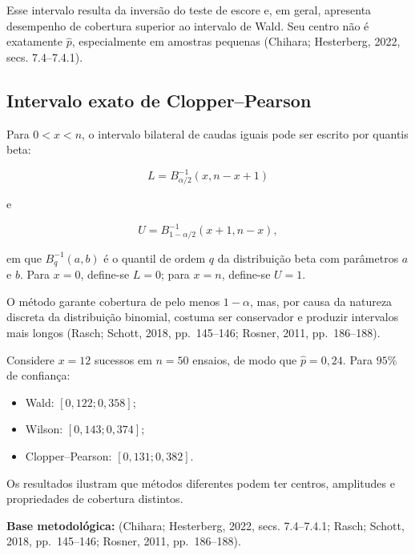 \documentclass[
  letterpaper,
  DIV=11,
  numbers=noendperiod]{scrreprt}
\providecommand{\tightlist}{%
  \setlength{\itemsep}{0pt}\setlength{\parskip}{0pt}}\usepackage{longtable,booktabs,array}
\begin{document}
Esse intervalo resulta da inversão do teste de escore e, em geral,
apresenta desempenho de cobertura superior ao intervalo de Wald. Seu
centro não é exatamente \(\widehat p\), especialmente em amostras
pequenas (Chihara; Hesterberg, 2022, secs. 7.4--7.4.1).

\subsection{Intervalo exato de
Clopper--Pearson}\label{intervalo-exato-de-clopperpearson}

Para \(0<x<n\), o intervalo bilateral de caudas iguais pode ser escrito
por quantis beta:

\[L=B^{-1}_{\alpha/2}(x,n-x+1)\]

e

\[U=B^{-1}_{1-\alpha/2}(x+1,n-x),\]

em que \(B^{-1}_q(a,b)\) é o quantil de ordem \(q\) da distribuição beta
com parâmetros \(a\) e \(b\). Para \(x=0\), define-se \(L=0\); para
\(x=n\), define-se \(U=1\).

O método garante cobertura de pelo menos \(1-\alpha\), mas, por causa da
natureza discreta da distribuição binomial, costuma ser conservador e
produzir intervalos mais longos (Rasch; Schott, 2018, pp.~145--146;
Rosner, 2011, pp.~186--188).

\begin{tcolorbox}[enhanced jigsaw, colback=white, leftrule=.75mm, colbacktitle=quarto-callout-note-color!10!white, breakable, titlerule=0mm, bottomtitle=1mm, title=\textcolor{quarto-callout-note-color}{\faInfo}\hspace{0.5em}{Exemplo --- comparação de intervalos para uma proporção}, colframe=quarto-callout-note-color-frame, toprule=.15mm, opacityback=0, bottomrule=.15mm, opacitybacktitle=0.6, arc=.35mm, toptitle=1mm, rightrule=.15mm, coltitle=black, left=2mm]

Considere \(x=12\) sucessos em \(n=50\) ensaios, de modo que
\(\widehat p=0{,}24\). Para \(95\%\) de confiança:

\begin{itemize}
\tightlist
\item
  Wald: \([0{,}122;0{,}358]\);
\item
  Wilson: \([0{,}143;0{,}374]\);
\item
  Clopper--Pearson: \([0{,}131;0{,}382]\).
\end{itemize}

Os resultados ilustram que métodos diferentes podem ter centros,
amplitudes e propriedades de cobertura distintos.

\textbf{Base metodológica:} (Chihara; Hesterberg, 2022, secs.
7.4--7.4.1; Rasch; Schott, 2018, pp.~145--146; Rosner, 2011,
pp.~186--188).

\end{tcolorbox}
\end{document}
